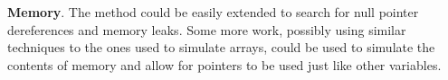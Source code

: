 \documentclass[12pt,a4paper]{article}
\begin{document}
\textbf{Memory}. The method could be easily extended to search for null pointer dereferences and memory leaks. Some more work, possibly using similar techniques to the ones used to simulate arrays, could be used to simulate the contents of memory and allow for pointers to be used just like other variables.

\end{document}
